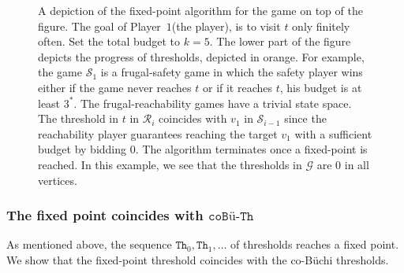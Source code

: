 \documentclass{theoretics}
\newcommand{\PO}{Player~$1$\xspace}
\newcommand{\G}{{\mathcal G}}
\newcommand{\R}{{\mathcal R}}
\renewcommand{\S}{{\mathcal S}}
\newcommand{\thresh}{\texttt{Th}\xspace}
\newcommand{\coTh}{\texttt{coB\"u-Th}}
\newcommand{\coBuchi}{\text{co-B\"uchi}\xspace}
\begin{document}
\begin{figure}
\begin{subfigure}[t]{0.95\textwidth}
			
	\end{subfigure}
	\caption{A depiction of the fixed-point algorithm for the \coBuchi game on top of the figure. The goal of \PO (the \coBuchi player), is to visit $t$ only finitely often. Set the total budget to $k=5$. The lower part of the figure depicts the progress of thresholds, depicted in orange.
	For example, the game $\S_1$ is a frugal-safety game in which the safety player wins either if the game never reaches $t$ or if it reaches $t$, his budget is at least $3^*$. The frugal-reachability games have a trivial state space. The threshold in $t$ in $\R_i$ coincides with $v_1$ in $\S_{i-1}$ since the reachability player guarantees reaching the target $v_1$ with a sufficient budget by bidding $0$.
The algorithm terminates once a fixed-point is reached. In this example, we see that the thresholds in \(\G\) are \(0\) in all vertices.}
\label{fig:Buchi}
\end{figure}




\subsubsection{The fixed point coincides with $\coTh$}
As mentioned above, the sequence $\thresh_0,\thresh_1,\ldots$ of thresholds reaches a fixed point. We show that the fixed-point threshold coincides with the co-B\"uchi thresholds. 
\end{document}
